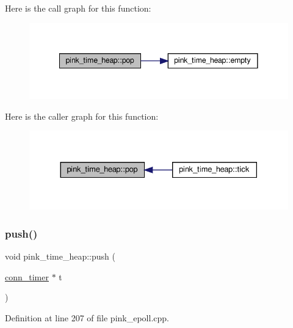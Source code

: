 Here is the call graph for this function\+:\nopagebreak
\begin{figure}[H]
\begin{center}
\leavevmode
\includegraphics[width=341pt]{classpink__time__heap_a5642ee3340cdee7983ed63770e7109d1_cgraph}
\end{center}
\end{figure}
Here is the caller graph for this function\+:\nopagebreak
\begin{figure}[H]
\begin{center}
\leavevmode
\includegraphics[width=330pt]{classpink__time__heap_a5642ee3340cdee7983ed63770e7109d1_icgraph}
\end{center}
\end{figure}
\mbox{\label{classpink__time__heap_aa74cc12fe4a94acbe75b70a3962a862f}} 
\subsubsection{\texorpdfstring{push()}{push()}}
{\footnotesize\ttfamily void pink\+\_\+time\+\_\+heap\+::push (\begin{DoxyParamCaption}\item[{\hyperlink{classconn__timer}{conn\+\_\+timer} $\ast$}]{t }\end{DoxyParamCaption})}



Definition at line 207 of file pink\+\_\+epoll.\+cpp.

\mbox{\label{classpink__time__heap_a9193dc948c6bb00005bf6639f2169b57}} 
